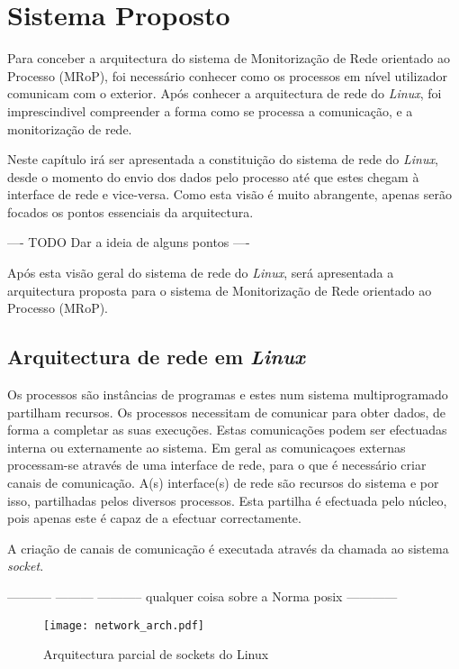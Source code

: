 \chapter{Sistema Proposto}
\label{cap:Estrutura}

Para conceber a arquitectura do sistema de Monitorização de Rede orientado ao Processo (MRoP), foi necessário conhecer como os processos em nível utilizador comunicam com o exterior.
Após conhecer a arquitectura de rede do \textit{Linux}, foi imprescindivel compreender a forma como se processa a comunicação, e a monitorização de rede.

Neste capítulo irá ser apresentada a constituição do sistema de rede do \textit{Linux}, desde o momento do envio dos dados pelo processo até que estes chegam à interface de rede e vice-versa.
Como esta visão é muito abrangente, apenas serão focados os pontos essenciais da arquitectura. 

---- TODO Dar a ideia de alguns pontos ----

Após esta visão geral do sistema de rede do \textit{Linux}, será apresentada a arquitectura proposta para o sistema de Monitorização de Rede orientado ao Processo (MRoP).



\section{Arquitectura de rede em \textit{Linux}}
\label{sub:network}

Os processos são instâncias de programas e estes num sistema multiprogramado partilham recursos.
Os processos necessitam de comunicar para obter dados, de forma a completar as suas execuções.
Estas comunicações podem ser efectuadas interna ou externamente ao sistema.
Em geral as comunicaçoes externas processam-se através de uma interface de rede, para o que é necessário criar canais de comunicação.
A(s) interface(s) de rede são recursos do sistema e por isso, partilhadas pelos diversos processos.
Esta partilha é efectuada pelo núcleo, pois apenas este é capaz de a efectuar correctamente.

A criação de canais de comunicação é executada através da chamada ao sistema \textit{socket}.

----------- --------- ----------- qualquer coisa sobre a Norma posix ------------

\begin{figure}[htbp]
\centering
\texttt{[image: network\_arch.pdf]} 
\caption{Arquitectura parcial de sockets do Linux}
\label{fig:network_arch}
\end{figure}

